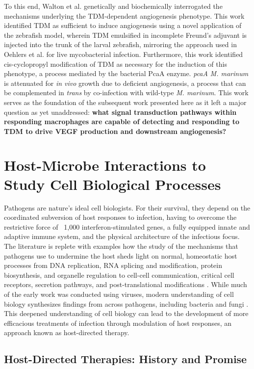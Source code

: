 To this end, Walton et al. genetically and biochemically interrogated the mechanisms underlying the TDM-dependent angiogenesis phenotype. This work identified TDM as sufficient to induce angiogenesis using a novel application of the zebrafish model, wherein TDM emulsified in incomplete Freund's adjuvant is injected into the trunk of the larval zebrafish, mirroring the approach used in Oehlers et al. for live mycobacterial infection. Furthermore, this work identified cis-cyclopropyl modification of TDM as necessary for the induction of this phenotype, a process mediated by the bacterial PcaA enzyme. \textDelta \textit{pcaA} \textit{M. marinum} is attenuated for \textit{in vivo} growth due to deficient angiogenesis, a process that can be complemented in \textit{trans} by co-infection with wild-type \textit{M. marinum}. This work serves as the foundation of the subsequent work presented here as it left a major question as yet unaddressed: \textbf{what signal transduction pathways within responding macrophages are capable of detecting and responding to TDM to drive VEGF production and downstream angiogenesis?}

\section{Host-Microbe Interactions to Study Cell Biological Processes}\label{hmi}

Pathogens are nature's ideal cell biologists. For their survival, they depend on the coordinated subversion of host responses to infection, having to overcome the restrictive force of ~1,000 interferon-stimulated genes, a fully equipped innate and adaptive immune system, and the physical architecture of the infectious focus. The literature is replete with examples how the study of the mechanisms that pathogens use to undermine the host sheds light on normal, homeostatic host processes from DNA replication, RNA splicing and modification, protein biosynthesis, and organelle regulation to cell-cell communication, critical cell receptors, secretion pathways, and post-translational modifications \citep{Compans1994}. While much of the early work was conducted using viruses, modern understanding of cell biology synthesizes findings from across pathogens, including bacteria and fungi \citep{Welch2015}. This deepened understanding of cell biology can lead to the development of more efficacious treatments of infection through modulation of host responses, an approach known as host-directed therapy.

\subsection{Host-Directed Therapies: History and Promise}\label{hdt}

